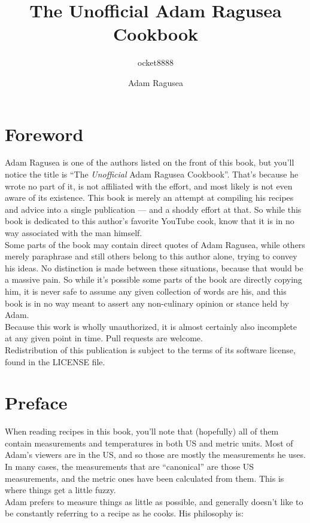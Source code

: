 \documentclass{book}
\title{The Unofficial Adam Ragusea Cookbook}
\author{ocket8888 \and Adam Ragusea}
\begin{document}
\maketitle{}

\chapter*{Foreword}
Adam Ragusea is one of the authors listed on the front of this book, but you'll
notice the title is ``The \emph{Unofficial} Adam Ragusea Cookbook''. That's
because he wrote no part of it, is not affiliated with the effort, and most
likely is not even aware of its existence. This book is merely an attempt at
compiling his recipes and advice into a single publication --- and a shoddy effort
at that. So while this book is dedicated to this author's favorite YouTube cook,
know that it is in no way associated with the man himself.\\
Some parts of the book may contain direct quotes of Adam Ragusea, while others
merely paraphrase and still others belong to this author alone, trying to convey
his ideas. No distinction is made between these situations, because that would
be a massive pain. So while it's possible some parts of the book are directly
copying him, it is never safe to assume any given collection of words are his,
and this book is in no way meant to assert any non-culinary opinion or stance
held by Adam.\\
Because this work is wholly unauthorized, it is almost certainly also incomplete
at any given point in time. Pull requests are welcome.\\
Redistribution of this publication is subject to the terms of its software
license, found in the LICENSE file.\\

\tableofcontents{}

\chapter*{Preface}
When reading recipes in this book, you'll note that (hopefully) all of them
contain measurements and temperatures in both US and metric units. Most of
Adam's viewers are in the US, and so those are mostly the measurements he uses.
In many cases, the measurements that are ``canonical'' are those US measurements,
and the metric ones have been calculated from them. This is where things get a
little fuzzy.\\
Adam prefers to measure things as little as possible, and generally doesn't like
to be constantly referring to a recipe as he cooks. His philosophy is:
\end{document}
